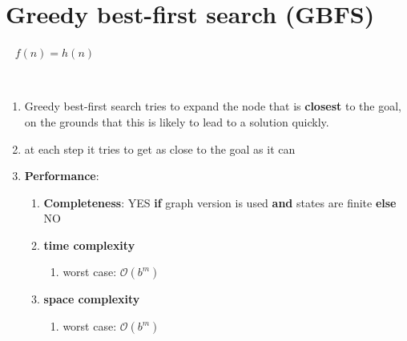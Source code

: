\section{Greedy best-first search (GBFS) \cite{ai/book/Artificial-Intelligence-A-Modern-Approach/Russell-Norvig}}
\label{AI: Algorithms/Greedy best-first search (GBFS)}

\ \hfill
$f(n) = h(n)$
\hfill \cite{ai/book/Artificial-Intelligence-A-Modern-Approach/Russell-Norvig}

\ \\

\begin{enumerate}
    \item Greedy best-first search tries to expand the node that is \textbf{closest} to the goal, on the grounds that this is likely to lead to a solution quickly.
    \hfill \cite{ai/book/Artificial-Intelligence-A-Modern-Approach/Russell-Norvig}

    \item at each step it tries to get as close to the goal as it can
    \hfill \cite{ai/book/Artificial-Intelligence-A-Modern-Approach/Russell-Norvig}

    \item \textbf{Performance}:
    \begin{enumerate}
        \item \textbf{Completeness}: YES \textbf{if} graph version is used \textbf{and} states are finite \textbf{else} NO
        \hfill \cite{ai/book/Artificial-Intelligence-A-Modern-Approach/Russell-Norvig}

        \item \textbf{time complexity}
        \begin{enumerate}
            \item worst case: $\mathcal{O}(b^m)$
            \hfill \cite{ai/book/Artificial-Intelligence-A-Modern-Approach/Russell-Norvig}
        \end{enumerate}

        \item \textbf{space complexity}
        \begin{enumerate}
            \item worst case: $\mathcal{O}(b^m)$
            \hfill \cite{ai/book/Artificial-Intelligence-A-Modern-Approach/Russell-Norvig}
        \end{enumerate}
    \end{enumerate}
\end{enumerate}




